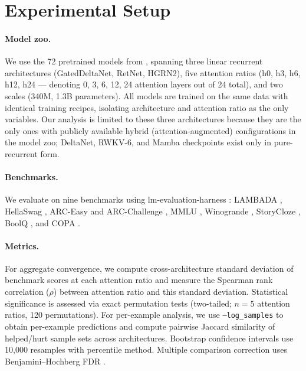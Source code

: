 \documentclass[11pt,twocolumn]{article}
\begin{document}
\section{Experimental Setup}\label{sec:setup}

\paragraph{Model zoo.}
We use the 72 pretrained models from \citet{wang2025mamba}, spanning three linear recurrent architectures (GatedDeltaNet, RetNet, HGRN2), five attention ratios (h0, h3, h6, h12, h24 --- denoting 0, 3, 6, 12, 24 attention layers out of 24 total), and two scales (340M, 1.3B parameters).
All models are trained on the same data with identical training recipes, isolating architecture and attention ratio as the only variables.
Our analysis is limited to these three architectures because they are the only ones with publicly available hybrid (attention-augmented) configurations in the model zoo; DeltaNet, RWKV-6, and Mamba checkpoints exist only in pure-recurrent form.

\paragraph{Benchmarks.}
We evaluate on nine benchmarks using lm-evaluation-harness \citep{gao2023framework}: LAMBADA \citep{paperno2016lambada}, HellaSwag \citep{zellers2019hellaswag}, ARC-Easy and ARC-Challenge \citep{clark2018think}, MMLU \citep{hendrycks2021measuring}, Winogrande \citep{sakaguchi2020winogrande}, StoryCloze \citep{mostafazadeh2016corpus}, BoolQ \citep{clark2019boolq}, and COPA \citep{roemmele2011choice}.

\paragraph{Metrics.}
For aggregate convergence, we compute cross-architecture standard deviation of benchmark scores at each attention ratio and measure the Spearman rank correlation ($\rho$) between attention ratio and this standard deviation.
Statistical significance is assessed via exact permutation tests (two-tailed; $n{=}5$ attention ratios, 120 permutations).
For per-example analysis, we use \texttt{--log\_samples} to obtain per-example predictions and compute pairwise Jaccard similarity of helped/hurt sample sets across architectures.
Bootstrap confidence intervals use 10,000 resamples with percentile method.
Multiple comparison correction uses Benjamini--Hochberg FDR \citep{benjamini1995controlling}.
\end{document}
